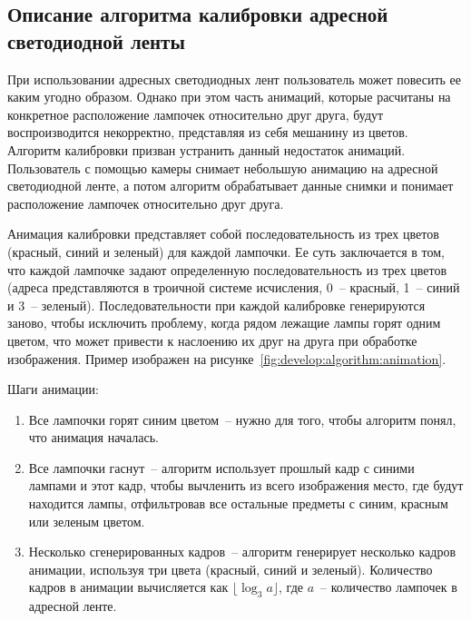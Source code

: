 \subsection{Описание алгоритма калибровки адресной светодиодной ленты}
\label{sec:develop:algorithm}

При использовании адресных светодиодных лент пользователь может повесить ее каким угодно образом. Однако при этом часть анимаций, которые расчитаны на конкретное расположение лампочек относительно друг друга, будут воспроизводится некорректно, представляя из себя мешанину из цветов. Алгоритм калибровки призван устранить данный недостаток анимаций. Пользователь с помощью камеры снимает небольшую анимацию на адресной светодиодной ленте, а потом алгоритм обрабатывает данные снимки и понимает расположение лампочек относительно друг друга.

Анимация калибровки представляет собой последовательность из трех цветов (красный, синий и зеленый) для каждой лампочки. Ее суть заключается в том, что каждой лампочке задают определенную последовательность из трех цветов (адреса представляются в троичной системе исчисления, 0~-- красный, 1~-- синий и 3~-- зеленый). Последовательности при каждой калибровке генерируются заново, чтобы исключить проблему, когда рядом лежащие лампы горят одним цветом, что может привести к наслоению их друг на друга при обработке изображения. Пример изображен на рисунке~\ref{fig:develop:algorithm:animation}.

Шаги анимации:
\begin{enumerate}[label=\arabic*]
	\item Все лампочки горят синим цветом~-- нужно для того, чтобы алгоритм понял, что анимация началась.
	\item Все лампочки гаснут~-- алгоритм использует прошлый кадр с синими лампами и этот кадр, чтобы вычленить из всего изображения место, где будут находится лампы, отфильтровав все остальные предметы с синим, красным или зеленым цветом.
	\item Несколько сгенерированных кадров~-- алгоритм генерирует несколько кадров анимации, используя три цвета (красный, синий и зеленый). Количество кадров в анимации вычисляется как $\lfloor\log_3 a\rfloor$, где $a$~-- количество лампочек в адресной ленте.
\end{enumerate}

